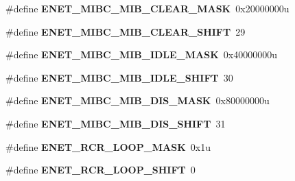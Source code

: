 \begin{DoxyCompactItemize}
\item 
\#define {\bfseries E\+N\+E\+T\+\_\+\+M\+I\+B\+C\+\_\+\+M\+I\+B\+\_\+\+C\+L\+E\+A\+R\+\_\+\+M\+A\+SK}~0x20000000u\hypertarget{group__ENET__Register__Masks_gaeab1ad7fdf634ff335c571ce0fcdbb71}{}\label{group__ENET__Register__Masks_gaeab1ad7fdf634ff335c571ce0fcdbb71}

\item 
\#define {\bfseries E\+N\+E\+T\+\_\+\+M\+I\+B\+C\+\_\+\+M\+I\+B\+\_\+\+C\+L\+E\+A\+R\+\_\+\+S\+H\+I\+FT}~29\hypertarget{group__ENET__Register__Masks_ga8bea19b7c620aa6b2af56b9d71da03b6}{}\label{group__ENET__Register__Masks_ga8bea19b7c620aa6b2af56b9d71da03b6}

\item 
\#define {\bfseries E\+N\+E\+T\+\_\+\+M\+I\+B\+C\+\_\+\+M\+I\+B\+\_\+\+I\+D\+L\+E\+\_\+\+M\+A\+SK}~0x40000000u\hypertarget{group__ENET__Register__Masks_ga780d8649845f0cce4e56318e194df98c}{}\label{group__ENET__Register__Masks_ga780d8649845f0cce4e56318e194df98c}

\item 
\#define {\bfseries E\+N\+E\+T\+\_\+\+M\+I\+B\+C\+\_\+\+M\+I\+B\+\_\+\+I\+D\+L\+E\+\_\+\+S\+H\+I\+FT}~30\hypertarget{group__ENET__Register__Masks_gaae8f76b07c6b9f2fc82ebad5baacc2a7}{}\label{group__ENET__Register__Masks_gaae8f76b07c6b9f2fc82ebad5baacc2a7}

\item 
\#define {\bfseries E\+N\+E\+T\+\_\+\+M\+I\+B\+C\+\_\+\+M\+I\+B\+\_\+\+D\+I\+S\+\_\+\+M\+A\+SK}~0x80000000u\hypertarget{group__ENET__Register__Masks_ga0e0763360e871b1a1f7e989f5695ece3}{}\label{group__ENET__Register__Masks_ga0e0763360e871b1a1f7e989f5695ece3}

\item 
\#define {\bfseries E\+N\+E\+T\+\_\+\+M\+I\+B\+C\+\_\+\+M\+I\+B\+\_\+\+D\+I\+S\+\_\+\+S\+H\+I\+FT}~31\hypertarget{group__ENET__Register__Masks_gadb11718d0241c2e441cc2eb36d9d9e6e}{}\label{group__ENET__Register__Masks_gadb11718d0241c2e441cc2eb36d9d9e6e}

\item 
\#define {\bfseries E\+N\+E\+T\+\_\+\+R\+C\+R\+\_\+\+L\+O\+O\+P\+\_\+\+M\+A\+SK}~0x1u\hypertarget{group__ENET__Register__Masks_ga0d93b88f79d8bdd51bb415a1ff84dd65}{}\label{group__ENET__Register__Masks_ga0d93b88f79d8bdd51bb415a1ff84dd65}

\item 
\#define {\bfseries E\+N\+E\+T\+\_\+\+R\+C\+R\+\_\+\+L\+O\+O\+P\+\_\+\+S\+H\+I\+FT}~0\hypertarget{group__ENET__Register__Masks_ga282373d2872e9226759336d35bb56c0a}{}\label{group__ENET__Register__Masks_ga282373d2872e9226759336d35bb56c0a}


\end{DoxyCompactItemize}
